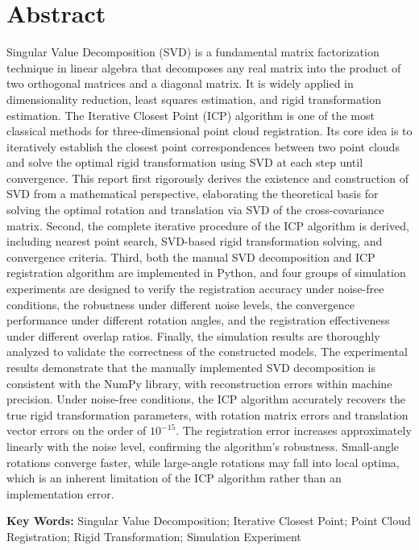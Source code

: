 \documentclass[a4paper,12pt]{ctexrep}
\begin{document}
\chapter*{Abstract}

Singular Value Decomposition (SVD) is a fundamental matrix factorization technique in linear algebra that decomposes any real matrix into the product of two orthogonal matrices and a diagonal matrix. It is widely applied in dimensionality reduction, least squares estimation, and rigid transformation estimation. The Iterative Closest Point (ICP) algorithm is one of the most classical methods for three-dimensional point cloud registration. Its core idea is to iteratively establish the closest point correspondences between two point clouds and solve the optimal rigid transformation using SVD at each step until convergence. This report first rigorously derives the existence and construction of SVD from a mathematical perspective, elaborating the theoretical basis for solving the optimal rotation and translation via SVD of the cross-covariance matrix. Second, the complete iterative procedure of the ICP algorithm is derived, including nearest point search, SVD-based rigid transformation solving, and convergence criteria. Third, both the manual SVD decomposition and ICP registration algorithm are implemented in Python, and four groups of simulation experiments are designed to verify the registration accuracy under noise-free conditions, the robustness under different noise levels, the convergence performance under different rotation angles, and the registration effectiveness under different overlap ratios. Finally, the simulation results are thoroughly analyzed to validate the correctness of the constructed models. The experimental results demonstrate that the manually implemented SVD decomposition is consistent with the NumPy library, with reconstruction errors within machine precision. Under noise-free conditions, the ICP algorithm accurately recovers the true rigid transformation parameters, with rotation matrix errors and translation vector errors on the order of $10^{-15}$. The registration error increases approximately linearly with the noise level, confirming the algorithm's robustness. Small-angle rotations converge faster, while large-angle rotations may fall into local optima, which is an inherent limitation of the ICP algorithm rather than an implementation error.

\vspace{1em}
\noindent\textbf{Key Words:} Singular Value Decomposition; Iterative Closest Point; Point Cloud Registration; Rigid Transformation; Simulation Experiment
\end{document}
